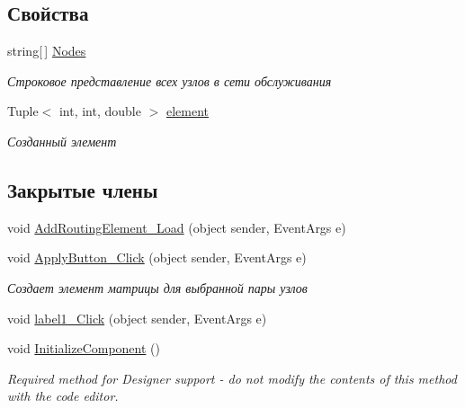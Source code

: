 \subsection*{Свойства}
\begin{DoxyCompactItemize}
\item 
string\mbox{[}$\,$\mbox{]} \hyperlink{class_desktop_network_analyzator_1_1_add_routing_element_a51fe780180cfe2071a33bd0e1c3db398}{Nodes}
\begin{DoxyCompactList}\small\item\em Строковое представление всех узлов в сети обслуживания \end{DoxyCompactList}\item 
Tuple$<$ int, int, double $>$ \hyperlink{class_desktop_network_analyzator_1_1_add_routing_element_ae93eacfe6cd3845360542b1e6b727a04}{element}
\begin{DoxyCompactList}\small\item\em Созданный элемент \end{DoxyCompactList}\end{DoxyCompactItemize}
\subsection*{Закрытые члены}
\begin{DoxyCompactItemize}
\item 
void \hyperlink{class_desktop_network_analyzator_1_1_add_routing_element_ab3824e9c687867106312afbf8498dd91}{Add\+Routing\+Element\+\_\+\+Load} (object sender, Event\+Args e)
\item 
void \hyperlink{class_desktop_network_analyzator_1_1_add_routing_element_a650794f03fa5fa37fbf866cd87caf45d}{Apply\+Button\+\_\+\+Click} (object sender, Event\+Args e)
\begin{DoxyCompactList}\small\item\em Создает элемент матрицы для выбранной пары узлов \end{DoxyCompactList}\item 
void \hyperlink{class_desktop_network_analyzator_1_1_add_routing_element_aba45fe28f7be06dc75a09ad57e15d5c1}{label1\+\_\+\+Click} (object sender, Event\+Args e)
\item 
void \hyperlink{class_desktop_network_analyzator_1_1_add_routing_element_a5ff95e240eb593739394ad1bef92e6e8}{Initialize\+Component} ()
\begin{DoxyCompactList}\small\item\em Required method for Designer support -\/ do not modify the contents of this method with the code editor. \end{DoxyCompactList}\end{DoxyCompactItemize}

